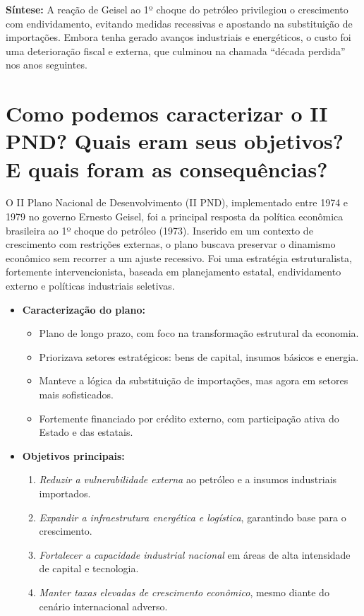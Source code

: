 \documentclass{sciposter}
\begin{document}
\begin{multicols}{3}
\textbf{Síntese:} A reação de Geisel ao 1º choque do petróleo privilegiou o crescimento com endividamento, evitando medidas recessivas e apostando na substituição de importações. Embora tenha gerado avanços industriais e energéticos, o custo foi uma deterioração fiscal e externa, que culminou na chamada “década perdida” nos anos seguintes.

\section{\textbf{Como podemos caracterizar o II PND? Quais eram seus objetivos? E quais foram as consequências?}}

O II Plano Nacional de Desenvolvimento (II PND), implementado entre 1974 e 1979 no governo Ernesto Geisel, foi a principal resposta da política econômica brasileira ao 1º choque do petróleo (1973). Inserido em um contexto de crescimento com restrições externas, o plano buscava preservar o dinamismo econômico sem recorrer a um ajuste recessivo. Foi uma estratégia estruturalista, fortemente intervencionista, baseada em planejamento estatal, endividamento externo e políticas industriais seletivas.

\begin{itemize}
    \item \textbf{Caracterização do plano:}
    \begin{itemize}
        \item Plano de longo prazo, com foco na transformação estrutural da economia.
        \item Priorizava setores estratégicos: bens de capital, insumos básicos e energia.
        \item Manteve a lógica da substituição de importações, mas agora em setores mais sofisticados.
        \item Fortemente financiado por crédito externo, com participação ativa do Estado e das estatais.
    \end{itemize}

    \item \textbf{Objetivos principais:}
    \begin{enumerate}
        \item \textit{Reduzir a vulnerabilidade externa} ao petróleo e a insumos industriais importados.
        \item \textit{Expandir a infraestrutura energética e logística}, garantindo base para o crescimento.
        \item \textit{Fortalecer a capacidade industrial nacional} em áreas de alta intensidade de capital e tecnologia.
        \item \textit{Manter taxas elevadas de crescimento econômico}, mesmo diante do cenário internacional adverso.
    \end{enumerate}


\end{itemize}
\end{multicols}
\end{document}
